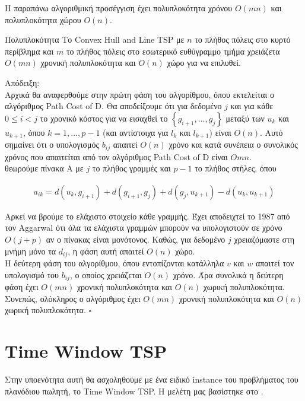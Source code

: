 \documentclass[oneside,12pt]{book}
\theoremstyle{definition}
\begin{document}
Η παραπάνω αλγοριθμική προσέγγιση έχει πολυπλοκότητα χρόνου \(Ο(mn)\) και πολυπλοκότητα χώρου \(Ο(n)\). \\

\begin{mytheorem}{Πολυπλοκότητα}{}
	Το Convex Hull and Line TSP με \(n\) το πλήθος πόλεις στο κυρτό περίβλημα και \(m\) το πλήθος πόλεις στο εσωτερικό ευθύγραμμο τμήμα χρειάζετα \(Ο(mn)\) χρονική πολυπλοκότητα και \(O(n)\) χώρο για να επιλυθεί.
\end{mytheorem}

Απόδειξη: \\
Αρχικά θα αναφερθούμε στην πρώτη φάση του αλγορίθμου, όπου εκτελείται ο αλγόριθμος Path Cost of D. Θα αποδείξουμε ότι για δεδομένο \(j\) και για κάθε \(0 \leq i < j\) το χρονικό κόστος για να εισαχθεί το \(\left\{g_{i+1},...,g_j\right\}\) μεταξύ των \(u_k\) και \(u_{k+1}\), όπου \(k = 1,...,p-1\) (και αντίστοιχα για \(l_k\) και \(l_{k+1}\)) είναι \(Ο(n)\). Αυτό σημαίνει ότι ο υπολογισμός \(b_{ij}\) απαιτεί \(Ο(n)\) χρόνο και κατά συνέπεια ο συνολικός χρόνος που απαιτείται από τον αλγόριθμος Path Cost of D είναι \(Οmn\). \\
θεωρούμε πίνακα Α με \(j\) το πλήθος γραμμές και \(p-1\) το πλήθος στήλες, όπου

\begin{align*}
	a_{ik} = d(u_k, g_{i+1}) + d(g_{i+1}, g_j) + d(g_j,u_{k+1}) - d(u_k, u_{k+1})
\end{align*}

Αρκεί να βρούμε το ελάχιστο στοιχείο κάθε γραμμής. Έχει αποδειχτεί το 1987 από τον Aggarwal ότι όλα τα ελάχιστα γραμμών μπορούν να υπολογιστούν σε χρόνο \(Ο(j+p)\) αν ο πίνακας είναι μονότονος. Καθώς, για δεδομένο \(j\) χρειαζόμαστε στη μνήμη μόνο τα \(d_{ij}\), η φάση αυτή απαιτεί \(Ο(n)\) χώρο. \\
Η δεύτερη φάση του αλγορίθμου, όπου εντοπίζονται κατάλληλα \(v\) και \(w\) απαιτεί τον υπολογισμό του \(b_{ij}\), ο οποίος χρειάζεται \(Ο(n)\) χρόνο. Άρα συνολικά η δεύτερη φάση έχει \(Ο(mn)\) χρονική πολυπλοκότητα και \(Ο(n)\) χωρική πολυπλοκότητα.
Συνεπώς, ολόκληρος ο αλγόριθμος έχει \(Ο(mn)\) χρονική πολυπλοκότητα και \(Ο(n)\) χωρική πολυπλοκότητα. \(\square\) \\

\section{Time Window TSP}

Στην υποενότητα αυτή θα ασχοληθούμε με ένα ειδικό instance του προβλήματος του πλανόδιου πωλητή, το Time Window TSP. Η μελέτη μας βασίστηκε στο \cite{12}. \\
\end{document}

